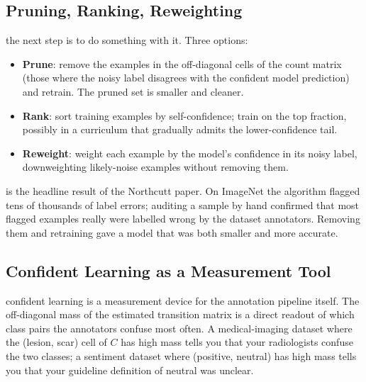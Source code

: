 \subsection{Pruning, Ranking, Reweighting}

 the next step is to do something with it. Three options:
\begin{itemize}
    \item \textbf{Prune}: remove the examples in the off-diagonal cells of the count matrix (those where the noisy label disagrees with the confident model prediction) and retrain. The pruned set is smaller and cleaner.
    \item \textbf{Rank}: sort training examples by self-confidence; train on the top fraction, possibly in a curriculum that gradually admits the lower-confidence tail.
    \item \textbf{Reweight}: weight each example by the model's confidence in its noisy label, downweighting likely-noise examples without removing them.
\end{itemize}

 is the headline result of the Northcutt paper. On ImageNet the algorithm flagged tens of thousands of label errors; auditing a sample by hand confirmed that most flagged examples really were labelled wrong by the dataset annotators. Removing them and retraining gave a model that was both smaller and more accurate.

\subsection{Confident Learning as a Measurement Tool}


 confident learning is a measurement device for the annotation pipeline itself. The off-diagonal mass of the estimated transition matrix is a direct readout of which class pairs the annotators confuse most often. A medical-imaging dataset where the (lesion, scar) cell of $C$ has high mass tells you that your radiologists confuse the two classes; a sentiment dataset where (positive, neutral) has high mass tells you that your guideline definition of neutral was unclear.

